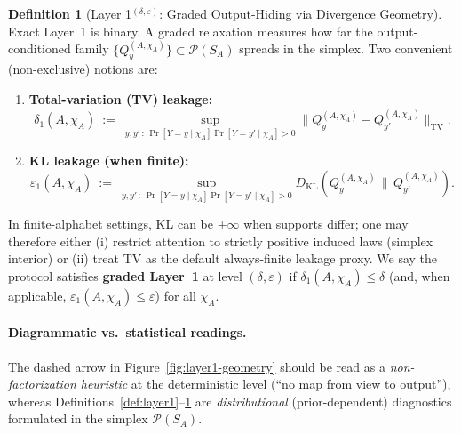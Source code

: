 \documentclass[11pt,a4paper]{article}
\theoremstyle{definition}
\newtheorem{definition}{Definition}[section]
\theoremstyle{plain}
\newcommand{\Prob}{\mathcal{P}}
\begin{document}
\begin{definition}[Layer 1$^{(\delta,\varepsilon)}$: Graded Output-Hiding via Divergence Geometry]
\label{def:layer1-approx}
Exact Layer~1 is binary. A graded relaxation measures how far the output-conditioned family
$\{Q_y^{(A,\chi_A)}\}\subset\Prob(S_A)$ spreads in the simplex.
Two convenient (non-exclusive) notions are:
\begin{enumerate}
    \item \textbf{Total-variation (TV) leakage:}
    \[
    \delta_1(A,\chi_A)\ :=\ \sup_{y,y'\,:\,\Pr[Y=y\mid \chi_A]\Pr[Y=y'\mid \chi_A]>0}
    \bigl\|Q_{y}^{(A,\chi_A)}-Q_{y'}^{(A,\chi_A)}\bigr\|_{\mathrm{TV}}.
    \]
    \item \textbf{KL leakage (when finite):}
    \[
    \varepsilon_1(A,\chi_A)\ :=\ \sup_{y,y'\,:\,\Pr[Y=y\mid \chi_A]\Pr[Y=y'\mid \chi_A]>0}
    D_{\mathrm{KL}}\!\left(Q_{y}^{(A,\chi_A)}\,\|\,Q_{y'}^{(A,\chi_A)}\right).
    \]
\end{enumerate}
In finite-alphabet settings, KL can be $+\infty$ when supports differ; one may therefore either (i) restrict attention to strictly positive induced laws (simplex interior) or (ii) treat TV as the default always-finite leakage proxy.
We say the protocol satisfies \textbf{graded Layer~1} at level $(\delta,\varepsilon)$ if
$\delta_1(A,\chi_A)\le \delta$ (and, when applicable, $\varepsilon_1(A,\chi_A)\le \varepsilon$) for all $\chi_A$.
\end{definition}

\paragraph{Diagrammatic vs.\ statistical readings.}
The dashed arrow in Figure~\ref{fig:layer1-geometry} should be read as a \emph{non-factorization heuristic} at the deterministic level (``no map from view to output''), whereas Definitions~\ref{def:layer1}--\ref{def:layer1-approx} are \emph{distributional} (prior-dependent) diagnostics formulated in the simplex $\Prob(S_A)$.
\end{document}
